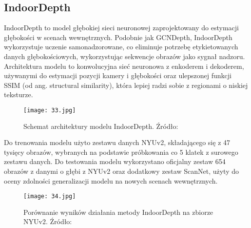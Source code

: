 \subsection{IndoorDepth}
IndoorDepth \cite{fan2023deeper} to model głębokiej sieci neuronowej zaprojektowany do estymacji głębokości w scenach wewnętrznych. Podobnie jak GCNDepth, IndoorDepth wykorzystuje uczenie samonadzorowane, co eliminuje potrzebę etykietowanych danych głębokościowych, wykorzystując sekwencje obrazów jako sygnał nadzoru. Architektura modelu to konwolucyjna sieć neuronowa z enkoderem i dekoderem, używanymi do estymacji pozycji kamery i głębokości oraz ulepszonej funkcji SSIM (od ang. structural similarity), która lepiej radzi sobie z regionami o niskiej teksturze.
\begin{figure}[H]
    \centering
    \texttt{[image: 33.jpg]}
    \caption{Schemat architektury modelu IndoorDepth. Źródło: \cite{fan2023deeper}}
    \label{fig:indoordepth-architecture}
\end{figure}
Do trenowania modelu użyto zestawu danych NYUv2, składającego się z 47 tysięcy obrazów, wybranych na podstawie próbkowania co 5 klatek z surowego zestawu danych. Do testowania modelu wykorzystano oficjalny zestaw 654 obrazów z danymi o głębi z NYUv2 oraz dodatkowy zestaw ScanNet, użyty do oceny zdolności generalizacji modelu na nowych scenach wewnętrznych.
\begin{figure}[H]
    \centering
    \texttt{[image: 34.jpg]}
    \caption{Porównanie wyników działania metody IndoorDepth na zbiorze NYUv2. Źródło: \cite{fan2023deeper}}
    \label{fig:indoordepth-results}
\end{figure}

